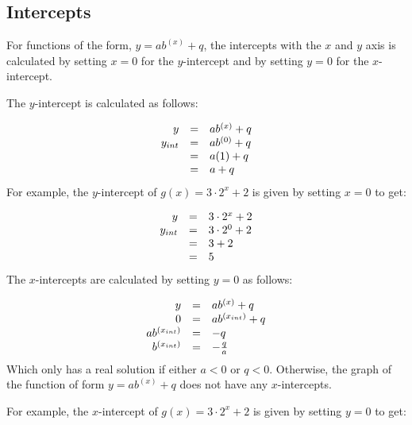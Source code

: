 \subsection*{Intercepts}
\nopagebreak
For functions of the form, $y=a{b}^{(x)}+q$, the intercepts with the $x$ and $y$ axis is calculated by setting $x=0$ for the $y$-intercept and by setting $y=0$ for the $x$-intercept.\par 
The $y$-intercept is calculated as follows:\par 
\nopagebreak\noindent{}
\begin{equation*}
\begin{array}{ccc}\hfill y& =& a{b}^{(x)}+q\hfill \\ \hfill {y}_{int}& =& a{b}^{(0)}+q\hfill \\ & =& a(1)+q\hfill \\ & =& a+q\hfill \end{array}
\end{equation*}
For example, the $y$-intercept of $g(x)=3\ensuremath{\cdot}{2}^{x}+2$ is given by setting $x=0$ to get:\par 
\nopagebreak\noindent{}
\begin{equation*}
\begin{array}{ccc}\hfill y& =& 3\ensuremath{\cdot}{2}^{x}+2\hfill \\ \hfill {y}_{int}& =& 3\ensuremath{\cdot}{2}^{0}+2\hfill \\ & =& 3+2\hfill \\ & =& 5\hfill \end{array}
\end{equation*}
The $x$-intercepts are calculated by setting $y=0$ as follows:\par 
\nopagebreak\noindent{}
\begin{equation*}
\begin{array}{ccc}\hfill y& =& a{b}^{(x)}+q\hfill \\ \hfill 0& =& a{b}^{({x}_{int})}+q\hfill \\ \hfill a{b}^{({x}_{int})}& =& -q\hfill \\ \hfill {b}^{({x}_{int})}& =& -\frac{q}{a}\hfill \end{array}
\end{equation*}
Which only has a real solution if either $a<0$ or $q<0$. Otherwise, the graph of the function of form $y=a{b}^{(x)}+q$ does not have any $x$-intercepts.\par 
For example, the $x$-intercept of $g(x)=3\ensuremath{\cdot}{2}^{x}+2$ is given by setting $y=0$ to get:\par 

